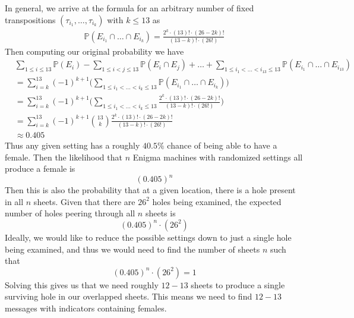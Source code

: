 \noindent In general, we arrive at the formula for an arbitrary number of fixed transpositions $(\tau_{i_1}, \dots, \tau_{i_k})$ with $k \le 13$ as
\begin{align*}
	\mathbb{P}(E_{i_1}\cap\dots\cap E_{i_k}) = \frac{2^k\cdot (13)!\cdot(26-2k)!}{(13-k)!\cdot(26!)}
\end{align*}
Then computing our original probability we have
\begin{align*}
	 & \sum_{1 \le i \le 13}\mathbb{P}(E_i) - \sum_{1\le i < j \le 13}\mathbb{P}(E_i\cap E_j) + \dots + \sum_{1\le i_1 < \dots <i_{13} \le 13}\mathbb{P}(E_{i_1}\cap\dots\cap E_{i_{13}}) \\
	 & = \sum_{i=k}^{13}(-1)^{k+1}\biggl(\sum_{1\le i_1 < \dots < i_k \le 13}\mathbb{P}(E_{i_1}\cap\dots\cap E_{i_k})\biggr)                                                              \\
	 & = \sum_{i=k}^{13}(-1)^{k+1}\biggl(\sum_{1\le i_1 < \dots < i_k \le 13}\frac{2^k\cdot (13)!\cdot(26-2k)!}{(13-k)!\cdot(26!)}\biggr)                                                 \\
	 & = \sum_{i=k}^{13}(-1)^{k+1}{13\choose k}\frac{2^k\cdot (13)!\cdot(26-2k)!}{(13-k)!\cdot(26!)}                                                                                      \\
	 & \approx 0.405
\end{align*}
\noindent Thus any given setting has a roughly $40.5\%$ chance of being able to have a female. Then the likelihood that $n$ Enigma machines with randomized settings all produce a female is
\[
	(0.405)^n
\]
Then this is also the probability that at a given location, there is a hole present in all $n$ sheets. Given that there are $26^2$ holes being examined, the expected number of holes peering through all $n$ sheets is
\[
	(0.405)^n\cdot(26^2)
\]
Ideally, we would like to reduce the possible settings down to just a single hole being examined, and thus we would need to find the number of sheets $n$ such that
\[
	(0.405)^n\cdot(26^2) = 1
\]
Solving this gives us that we need roughly $12-13$ sheets to produce a single surviving hole in our overlapped sheets. This means we need to find $12-13$ messages with indicators containing females.



